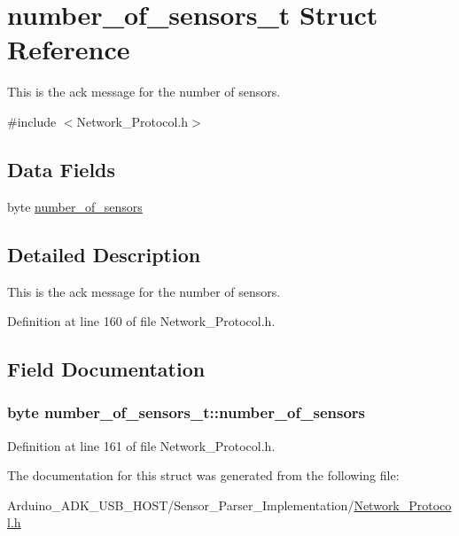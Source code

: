 \hypertarget{structnumber__of__sensors__t}{\section{number\-\_\-of\-\_\-sensors\-\_\-t Struct Reference}
\label{structnumber__of__sensors__t}
}


This is the ack message for the number of sensors.  




{\ttfamily \#include $<$Network\-\_\-\-Protocol.\-h$>$}

\subsection*{Data Fields}
\begin{DoxyCompactItemize}
\item 
byte \hyperlink{structnumber__of__sensors__t_a14c368062d2ef5eb1944f0a7ee2b99c0}{number\-\_\-of\-\_\-sensors}
\end{DoxyCompactItemize}


\subsection{Detailed Description}
This is the ack message for the number of sensors. 

Definition at line 160 of file Network\-\_\-\-Protocol.\-h.



\subsection{Field Documentation}
\hypertarget{structnumber__of__sensors__t_a14c368062d2ef5eb1944f0a7ee2b99c0}{
\subsubsection[{number\-\_\-of\-\_\-sensors}]{\setlength{\rightskip}{0pt plus 5cm}byte number\-\_\-of\-\_\-sensors\-\_\-t\-::number\-\_\-of\-\_\-sensors}}\label{structnumber__of__sensors__t_a14c368062d2ef5eb1944f0a7ee2b99c0}


Definition at line 161 of file Network\-\_\-\-Protocol.\-h.



The documentation for this struct was generated from the following file\-:\begin{DoxyCompactItemize}
\item 
Arduino\-\_\-\-A\-D\-K\-\_\-\-U\-S\-B\-\_\-\-H\-O\-S\-T/\-Sensor\-\_\-\-Parser\-\_\-\-Implementation/\hyperlink{_network___protocol_8h}{Network\-\_\-\-Protocol.\-h}\end{DoxyCompactItemize}
